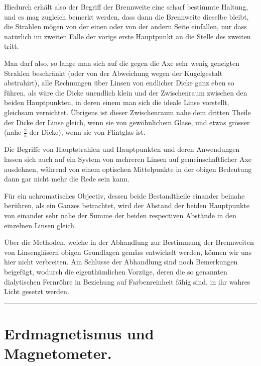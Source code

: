 \documentclass[12pt,a4paper]{article}
\begin{document}
Hiedurch erhält also der Begriff der Brennweite eine scharf bestimmte Haltung, und es mag zugleich bemerkt werden, dass dann die Brennweite dieselbe bleibt, die Strahlen mögen von der einen oder von der andern Seite einfallen, nur dass natürlich im zweiten Falle der vorige erste Hauptpunkt an die Stelle des zweiten tritt.

Man darf also, so lange man sich auf die gegen die Axe sehr wenig geneigten Strahlen beschränkt (oder von der Abweichung wegen der Kugelgestalt abstrahirt), alle Rechnungen über Linsen von endlicher Dicke ganz eben so führen, als wäre die Dicke unendlich klein und der Zwischenraum zwischen den beiden Hauptpunkten, in deren einem man sich die ideale Linse vorstellt, gleichsam vernichtet. Übrigens ist dieser Zwischenraum nahe dem dritten Theile der Dicke der Linse gleich, wenn sie von gewöhnlichem Glase, und etwas grösser (nahe $\tfrac{2}{5}$ der Dicke), wenn sie von Flintglas ist.

Die Begriffe von Hauptstrahlen und Hauptpunkten und deren Anwendungen lassen sich auch auf ein System von mehreren Linsen auf gemeinschaftlicher Axe ausdehnen, während von einem optischen Mittelpunkte in der obigen Bedeutung dann gar nicht mehr die Rede sein kann.

Für ein achromatisches Objectiv, dessen beide Bestandtheile einander beinahe berühren, als ein Ganzes betrachtet, wird der Abstand der beiden Hauptpunkte von einander sehr nahe der Summe der beiden respectiven Abstände in den einzelnen Linsen gleich.

Über die Methoden, welche in der Abhandlung zur Bestimmung der Brennweiten von Linsengläsern obigen Grundlagen gemäss entwickelt werden, können wir uns hier nicht verbreiten. Am Schlusse der Abhandlung sind noch Bemerkungen beigefügt, wodurch die eigenthümlichen Vorzüge, deren die so genannten dialytischen Fernröhre in Beziehung auf Farbenreinheit fähig sind, in ihr wahres Licht gesetzt werden.

\vspace{2em}
\begin{center}
    \rule{0.5\textwidth}{0.4pt}
\end{center}
\vspace{1em}

\section*{Erdmagnetismus und Magnetometer.}
\end{document}
